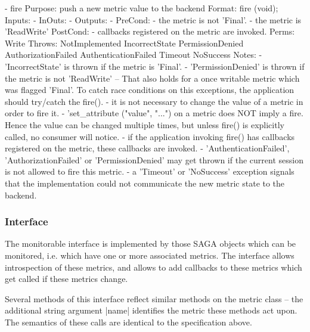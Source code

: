 \begin{myspec}
 
    - fire
      Purpose:  push a new metric value to the backend
      Format:   fire               (void);
      Inputs:   -
      InOuts:   -
      Outputs:  -
      PreCond:  - the metric is not 'Final'.
                - the metric is 'ReadWrite'
      PostCond: - callbacks registered on the metric are
                  invoked.
      Perms:    Write
      Throws:   NotImplemented
                IncorrectState
                PermissionDenied
                AuthorizationFailed
                AuthenticationFailed
                Timeout
                NoSuccess
      Notes:    - 'IncorrectState' is thrown if the metric is 
                  'Final'.
                - 'PermissionDenied' is thrown if the metric is 
                  not 'ReadWrite' -- That also holds for a once
                  writable metric which was flagged 'Final'.
                  To catch race conditions on this exceptions,
                  the application should try/catch the fire().
                - it is not necessary to change the value of a
                  metric in order to fire it.
                - 'set_attribute ("value", "...") on a metric
                  does NOT imply a fire.  Hence the value can be
                  changed multiple times, but unless fire() is
                  explicitly called, no consumer will notice.
                - if the application invoking fire() has
                  callbacks registered on the metric, these 
                  callbacks are invoked.
                - 'AuthenticationFailed', 'AuthorizationFailed' 
                  or 'PermissionDenied' may get thrown if the
                  current session is not allowed to fire this 
                  metric.
                - a 'Timeout' or 'NoSuccess' exception signals 
                  that the implementation could not communicate 
                  the new metric state to the backend.
 \end{myspec}
 
  \subsubsection*{Interface }
 
    The monitorable interface is implemented by those SAGA
    objects which can be monitored, i.e. which have one or more
    associated metrics.  The interface allows introspection of
    these metrics, and allows to add callbacks to these metrics
    which get called if these metrics change.
 
    Several methods of this interface reflect similar methods on
    the metric class -- the additional string argument |name|
    identifies the metric these methods act upon.  The semantics
    of these calls are identical to the specification above.
 
